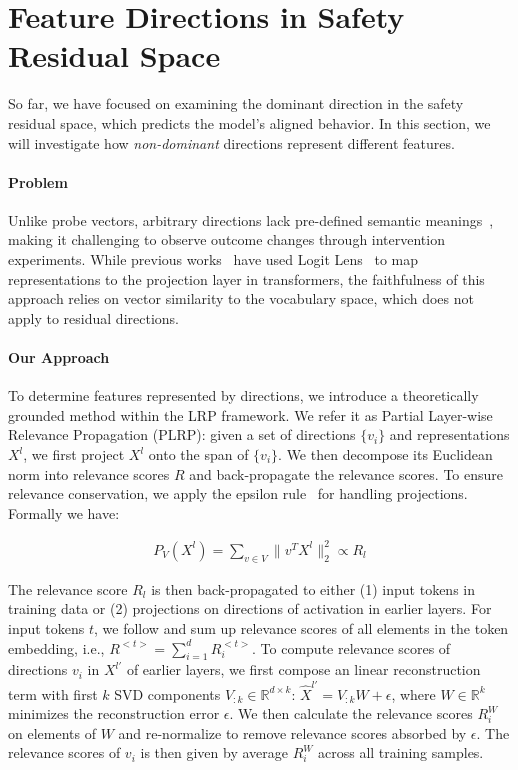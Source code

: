 \section{Feature Directions in Safety Residual Space}
\label{sec:interpretation}


So far, we have focused on examining the dominant direction in the safety residual space, which predicts the model's aligned behavior. In this section, we will investigate how \textit{non-dominant} directions represent different features.

\paragraph{Problem} 
Unlike probe vectors, arbitrary directions lack pre-defined semantic meanings~\cite{bricken2023monosemanticity}, making it challenging to observe outcome changes through intervention experiments. While previous works~\cite{Ball2024UnderstandingJS,lee2024mechanistic} have used Logit Lens~\cite{nostalgebraist2020interpreting} to map representations to the projection layer in transformers, the faithfulness of this approach relies on vector similarity to the vocabulary space, which does not apply to residual directions.

\paragraph{Our Approach}

To determine features represented by directions, we introduce a theoretically grounded method within the LRP framework. We refer it as Partial Layer-wise Relevance Propagation (PLRP): given a set of directions $\{v_i\}$ and representations $X^l$, we first project $X^l$ onto the span of $\{v_i\}$. We then decompose its Euclidean norm into relevance scores $R$ and back-propagate the relevance scores. To ensure relevance conservation, we apply the epsilon rule~\cite{bach2015pixel} for handling projections. Formally we have:

\begin{align*}
    P_V(X^l
    ) = \sum_{v \in V} \|v^T X^l\|_2^2 \propto R_l
\end{align*}

The relevance score $R_l$ is then back-propagated to either (1) input tokens in training data or (2) projections on directions of activation in earlier layers. For input tokens $t$, we follow \citet{achtibat2024attnlrp} and sum up relevance scores of all elements in the token embedding, i.e., $R^{<t>} = \sum_{i=1}^{d} R_i^{<t>}$. To compute relevance scores of directions $v_i$ in $X^{l'}$ of earlier layers, we first compose an linear reconstruction term with first $k$ SVD components $V_{:k} \in \mathbb{R}^{d \times k}$: $\hat{X}^{l'} = V_{:k}W + \epsilon$, where $W \in \mathbb{R}^k$ minimizes the reconstruction error $\epsilon$. We then calculate the relevance scores $R^W_i$ on elements of $W$ and re-normalize to remove relevance scores absorbed by $\epsilon$. The relevance scores of $v_i$ is then given by average $R^W_i$ across all training samples.

